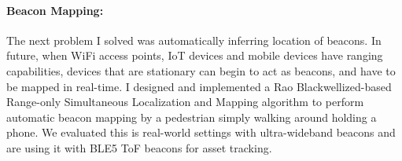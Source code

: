\documentclass[10pt]{article}
\begin{document}

\paragraph{Beacon Mapping: }
The next problem I solved was automatically inferring location of beacons. In future, when WiFi access points, IoT devices and mobile devices have ranging capabilities, devices that are stationary can begin to act as beacons, and have to be mapped in real-time. %
I designed and implemented a Rao Blackwellized-based Range-only Simultaneous Localization and Mapping algorithm to perform automatic beacon mapping by a pedestrian simply walking around holding a phone. We evaluated this is real-world settings with ultra-wideband beacons and are using it with BLE5 ToF beacons for asset tracking. 


\end{document}
